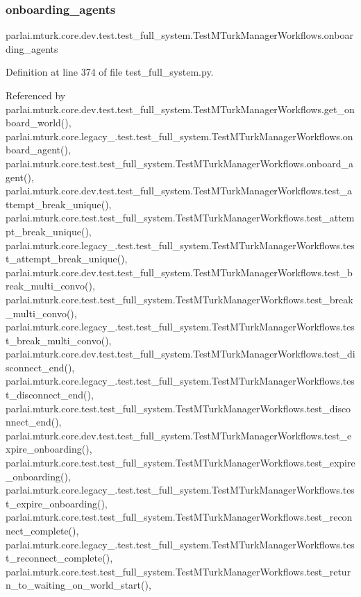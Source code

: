 \subsubsection{\texorpdfstring{onboarding\+\_\+agents}{onboarding\_agents}}
{\footnotesize\ttfamily parlai.\+mturk.\+core.\+dev.\+test.\+test\+\_\+full\+\_\+system.\+Test\+M\+Turk\+Manager\+Workflows.\+onboarding\+\_\+agents}



Definition at line 374 of file test\+\_\+full\+\_\+system.\+py.



Referenced by parlai.\+mturk.\+core.\+dev.\+test.\+test\+\_\+full\+\_\+system.\+Test\+M\+Turk\+Manager\+Workflows.\+get\+\_\+onboard\+\_\+world(), parlai.\+mturk.\+core.\+legacy\+\_.\+test.\+test\+\_\+full\+\_\+system.\+Test\+M\+Turk\+Manager\+Workflows.\+onboard\+\_\+agent(), parlai.\+mturk.\+core.\+test.\+test\+\_\+full\+\_\+system.\+Test\+M\+Turk\+Manager\+Workflows.\+onboard\+\_\+agent(), parlai.\+mturk.\+core.\+dev.\+test.\+test\+\_\+full\+\_\+system.\+Test\+M\+Turk\+Manager\+Workflows.\+test\+\_\+attempt\+\_\+break\+\_\+unique(), parlai.\+mturk.\+core.\+test.\+test\+\_\+full\+\_\+system.\+Test\+M\+Turk\+Manager\+Workflows.\+test\+\_\+attempt\+\_\+break\+\_\+unique(), parlai.\+mturk.\+core.\+legacy\+\_.\+test.\+test\+\_\+full\+\_\+system.\+Test\+M\+Turk\+Manager\+Workflows.\+test\+\_\+attempt\+\_\+break\+\_\+unique(), parlai.\+mturk.\+core.\+dev.\+test.\+test\+\_\+full\+\_\+system.\+Test\+M\+Turk\+Manager\+Workflows.\+test\+\_\+break\+\_\+multi\+\_\+convo(), parlai.\+mturk.\+core.\+test.\+test\+\_\+full\+\_\+system.\+Test\+M\+Turk\+Manager\+Workflows.\+test\+\_\+break\+\_\+multi\+\_\+convo(), parlai.\+mturk.\+core.\+legacy\+\_.\+test.\+test\+\_\+full\+\_\+system.\+Test\+M\+Turk\+Manager\+Workflows.\+test\+\_\+break\+\_\+multi\+\_\+convo(), parlai.\+mturk.\+core.\+dev.\+test.\+test\+\_\+full\+\_\+system.\+Test\+M\+Turk\+Manager\+Workflows.\+test\+\_\+disconnect\+\_\+end(), parlai.\+mturk.\+core.\+legacy\+\_.\+test.\+test\+\_\+full\+\_\+system.\+Test\+M\+Turk\+Manager\+Workflows.\+test\+\_\+disconnect\+\_\+end(), parlai.\+mturk.\+core.\+test.\+test\+\_\+full\+\_\+system.\+Test\+M\+Turk\+Manager\+Workflows.\+test\+\_\+disconnect\+\_\+end(), parlai.\+mturk.\+core.\+dev.\+test.\+test\+\_\+full\+\_\+system.\+Test\+M\+Turk\+Manager\+Workflows.\+test\+\_\+expire\+\_\+onboarding(), parlai.\+mturk.\+core.\+test.\+test\+\_\+full\+\_\+system.\+Test\+M\+Turk\+Manager\+Workflows.\+test\+\_\+expire\+\_\+onboarding(), parlai.\+mturk.\+core.\+legacy\+\_.\+test.\+test\+\_\+full\+\_\+system.\+Test\+M\+Turk\+Manager\+Workflows.\+test\+\_\+expire\+\_\+onboarding(), parlai.\+mturk.\+core.\+test.\+test\+\_\+full\+\_\+system.\+Test\+M\+Turk\+Manager\+Workflows.\+test\+\_\+reconnect\+\_\+complete(), parlai.\+mturk.\+core.\+legacy\+\_.\+test.\+test\+\_\+full\+\_\+system.\+Test\+M\+Turk\+Manager\+Workflows.\+test\+\_\+reconnect\+\_\+complete(), parlai.\+mturk.\+core.\+test.\+test\+\_\+full\+\_\+system.\+Test\+M\+Turk\+Manager\+Workflows.\+test\+\_\+return\+\_\+to\+\_\+waiting\+\_\+on\+\_\+world\+\_\+start(), 